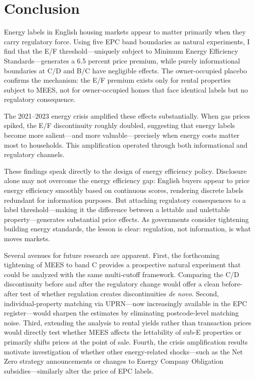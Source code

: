 \documentclass[12pt]{article}
\begin{document}
\section{Conclusion}\label{sec:conclusion}

Energy labels in English housing markets appear to matter primarily when they carry regulatory force. Using five EPC band boundaries as natural experiments, I find that the E/F threshold---uniquely subject to Minimum Energy Efficiency Standards---generates a 6.5 percent price premium, while purely informational boundaries at C/D and B/C have negligible effects. The owner-occupied placebo confirms the mechanism: the E/F premium exists only for rental properties subject to MEES, not for owner-occupied homes that face identical labels but no regulatory consequence.

The 2021--2023 energy crisis amplified these effects substantially. When gas prices spiked, the E/F discontinuity roughly doubled, suggesting that energy labels become more salient---and more valuable---precisely when energy costs matter most to households. This amplification operated through both informational and regulatory channels.

These findings speak directly to the design of energy efficiency policy. Disclosure alone may not overcome the energy efficiency gap: English buyers appear to price energy efficiency smoothly based on continuous scores, rendering discrete labels redundant for information purposes. But attaching regulatory consequences to a label threshold---making it the difference between a lettable and unlettable property---generates substantial price effects. As governments consider tightening building energy standards, the lesson is clear: regulation, not information, is what moves markets.

Several avenues for future research are apparent. First, the forthcoming tightening of MEES to band C provides a prospective natural experiment that could be analyzed with the same multi-cutoff framework. Comparing the C/D discontinuity before and after the regulatory change would offer a clean before-after test of whether regulation creates discontinuities \textit{de novo}. Second, individual-property matching via UPRN---now increasingly available in the EPC register---would sharpen the estimates by eliminating postcode-level matching noise. Third, extending the analysis to rental yields rather than transaction prices would directly test whether MEES affects the lettability of sub-E properties or primarily shifts prices at the point of sale. Fourth, the crisis amplification results motivate investigation of whether other energy-related shocks---such as the Net Zero strategy announcements or changes to Energy Company Obligation subsidies---similarly alter the price of EPC labels.
\end{document}

